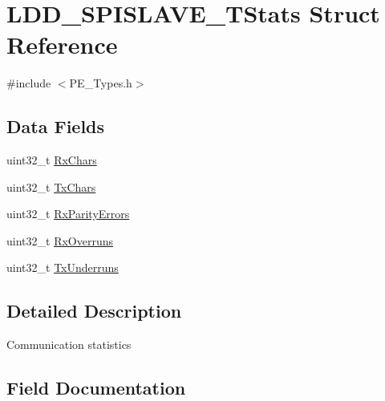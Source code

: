 \hypertarget{struct_l_d_d___s_p_i_s_l_a_v_e___t_stats}{}\section{L\+D\+D\+\_\+\+S\+P\+I\+S\+L\+A\+V\+E\+\_\+\+T\+Stats Struct Reference}
\label{struct_l_d_d___s_p_i_s_l_a_v_e___t_stats}


{\ttfamily \#include $<$P\+E\+\_\+\+Types.\+h$>$}

\subsection*{Data Fields}
\begin{DoxyCompactItemize}
\item 
uint32\+\_\+t \hyperlink{struct_l_d_d___s_p_i_s_l_a_v_e___t_stats_a91f6acf13143110968772d344d352fc6}{Rx\+Chars}
\item 
uint32\+\_\+t \hyperlink{struct_l_d_d___s_p_i_s_l_a_v_e___t_stats_ab674ba50318e198a1ee9dea0692ce239}{Tx\+Chars}
\item 
uint32\+\_\+t \hyperlink{struct_l_d_d___s_p_i_s_l_a_v_e___t_stats_abef442625b92cf52c2ff04edf6894dd3}{Rx\+Parity\+Errors}
\item 
uint32\+\_\+t \hyperlink{struct_l_d_d___s_p_i_s_l_a_v_e___t_stats_a82edd5dc5e18e7cd6a047d0efbda97ae}{Rx\+Overruns}
\item 
uint32\+\_\+t \hyperlink{struct_l_d_d___s_p_i_s_l_a_v_e___t_stats_ab2e5342f4a486b20ae9306f451451a77}{Tx\+Underruns}
\end{DoxyCompactItemize}


\subsection{Detailed Description}
Communication statistics 

\subsection{Field Documentation}
\mbox{\label{struct_l_d_d___s_p_i_s_l_a_v_e___t_stats_a91f6acf13143110968772d344d352fc6}} 
